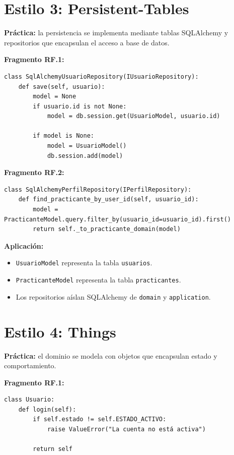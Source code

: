 \documentclass[12pt,a4paper]{article}
\begin{document}
\section{Estilo 3: Persistent-Tables}

\textbf{Práctica:} la persistencia se implementa mediante tablas SQLAlchemy y repositorios que encapsulan el acceso a base de datos.

\textbf{Fragmento RF.1:}

\begin{lstlisting}[style=pythonstyle]
class SqlAlchemyUsuarioRepository(IUsuarioRepository):
    def save(self, usuario):
        model = None
        if usuario.id is not None:
            model = db.session.get(UsuarioModel, usuario.id)

        if model is None:
            model = UsuarioModel()
            db.session.add(model)
\end{lstlisting}

\textbf{Fragmento RF.2:}

\begin{lstlisting}[style=pythonstyle]
class SqlAlchemyPerfilRepository(IPerfilRepository):
    def find_practicante_by_user_id(self, usuario_id):
        model = PracticanteModel.query.filter_by(usuario_id=usuario_id).first()
        return self._to_practicante_domain(model)
\end{lstlisting}

\textbf{Aplicación:}

\begin{itemize}
    \item \texttt{UsuarioModel} representa la tabla \texttt{usuarios}.
    \item \texttt{PracticanteModel} representa la tabla \texttt{practicantes}.
    \item Los repositorios aíslan SQLAlchemy de \texttt{domain} y \texttt{application}.
\end{itemize}

\section{Estilo 4: Things}

\textbf{Práctica:} el dominio se modela con objetos que encapsulan estado y comportamiento.

\textbf{Fragmento RF.1:}

\begin{lstlisting}[style=pythonstyle]
class Usuario:
    def login(self):
        if self.estado != self.ESTADO_ACTIVO:
            raise ValueError("La cuenta no está activa")

        return self
\end{lstlisting}
\end{document}
